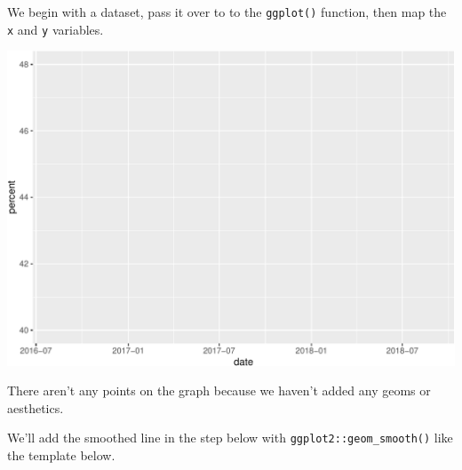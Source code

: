 \documentclass[letterpaper,12pt,twoside,]{pinp}
\begin{document}
We begin with a dataset, pass it over to to the \texttt{ggplot()}
function, then map the \texttt{x} and \texttt{y} variables.

\begin{Shaded}
\begin{Highlighting}[]
\OtherTok{\textless{}{-}}\SpecialCharTok{\%\textgreater{}\%} \NormalTok{(} \NormalTok{(}
\end{Highlighting}
\end{Shaded}

\begin{center}\includegraphics{03-intro-to-ggplot2_files/figure-latex/TidyBrexit-ggplot-1} \end{center}

There aren't any points on the graph because we haven't added any geoms
or aesthetics.

We'll add the smoothed line in the step below with
\texttt{ggplot2::geom\_smooth()} like the template below.

\begin{Shaded}
\begin{Highlighting}[]
\SpecialCharTok{\textless{}}\SpecialCharTok{\textgreater{}} \SpecialCharTok{\%\textgreater{}\%} 
  \NormalTok{(} \NormalTok{(} \SpecialCharTok{\textless{}}\SpecialCharTok{\textgreater{}}\NormalTok{, } \SpecialCharTok{\textless{}}\SpecialCharTok{\textgreater{}}\NormalTok{)) }\SpecialCharTok{+} 
    \ErrorTok{\textless{}}\SpecialCharTok{\textgreater{}}\NormalTok{(} \NormalTok{(}\SpecialCharTok{\textless{}}\SpecialCharTok{\textgreater{}}\NormalTok{))}
\end{Highlighting}
\end{Shaded}
\end{document}

